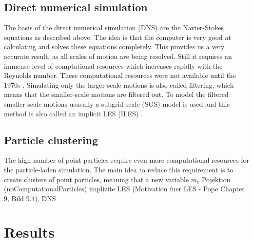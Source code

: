 \documentclass[a4paper,10pt]{article}
\numberwithin{equation}{section} %
\begin{document}
\subsection{Direct numerical simulation}
The basis of the direct numerical simulation (DNS) are the Navier-Stokes equations as described above. The idea is that the computer is very good at calculating and solves these equations completely. This provides us a very accurate result, as all scales of motion are being resolved. Still it requires an immense level of comptational resources which increases rapidly with the Reynolds number. These computational resources were not available until the 1970s \cite{turbulentFlows}.
\newline
Simulating only the larger-scale motions is also called filtering, which means that the smaller-scale motions are filtered out. To model the filtered smaller-scale motions ususally a subgrid-scale (SGS) model is used and this method is also called an implicit LES (ILES) \cite{turbulentFlows}. %
\subsection{Particle clustering}
The high number of point particles require even more computational resources for the particle-laden simulation. The main idea to reduce this requirement is to create clusters of point particles, meaning that a new variable $m_\mathrm{c}$
\pagebreak
Pojektion (noComputationalParticles)
implizite LES (Motivation fuer LES -  Pope Chapter 9, Bild 9.4), DNS
\pagebreak
\section{Results}
\end{document}
